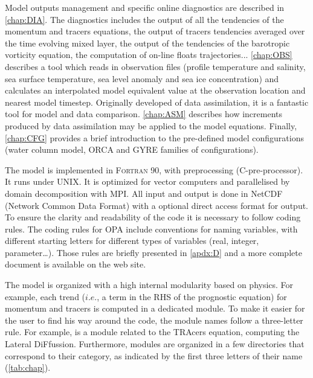 \documentclass[../tex_main/NEMO_manual]{subfiles}
\begin{document}

Model outputs management and specific online diagnostics are described in \autoref{chap:DIA}.
The diagnostics includes the output of all the tendencies of the momentum and tracers equations, 
the output of tracers tendencies averaged over the time evolving mixed layer, the output of 
the tendencies of the barotropic vorticity equation, the computation of on-line floats trajectories... 
\autoref{chap:OBS} describes a tool which reads in observation files (profile temperature 
and salinity, sea surface temperature, sea level anomaly and sea ice concentration) 
and calculates an interpolated model equivalent value at the observation location 
and nearest model timestep. Originally developed of data assimilation, it is a fantastic 
tool for model and data comparison. \autoref{chap:ASM} describes how increments 
produced by data assimilation may be applied to the model equations.
Finally, \autoref{chap:CFG} provides a brief introduction to the pre-defined model 
configurations (water column model, ORCA and GYRE families of configurations).

The model is implemented in \textsc{Fortran 90}, with preprocessing (C-pre-processor). 
It runs under UNIX. It is optimized for vector computers and parallelised by domain  
decomposition with MPI. All input and output is done in NetCDF (Network Common Data 
Format) with a optional direct access format for output. To ensure the clarity and 
readability of the code it is necessary to follow coding rules. The coding rules for OPA 
include conventions for naming variables, with different starting letters for different types 
of variables (real, integer, parameter\ldots). Those rules are briefly presented in 
\autoref{apdx:D} and a more complete document is available on the \NEMO web site.

The model is organized with a high internal modularity based on physics. For example, 
each trend ($i.e.$, a term in the RHS of the prognostic equation) for momentum and 
tracers is computed in a dedicated module.  To make it easier for the user to find his way 
around the code, the module names follow a three-letter rule. For example,  
is a module related to the TRAcers equation, computing the Lateral DiFfussion. 
Furthermore, modules are organized in a few directories that correspond to their category, 
as indicated by the first three letters of their name (\autoref{tab:chap}).
\end{document}
